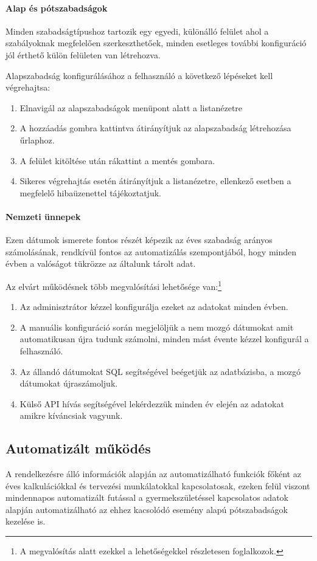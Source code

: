 \paragraph{Alap és pótszabadságok}
Minden szabadságtípushoz tartozik egy egyedi, különálló felület ahol a szabályoknak megfelelően szerkeszthetőek, minden esetleges további konfiguráció jól érthető külön felületen van létrehozva.

	Alapszabadság konfigurálásához a felhasználó a következő lépéseket kell végrehajtsa:
	\begin{enumerate}
		\item Elnavigál az alapszabadságok menüpont alatt a listanézetre
		\item A hozzáadás gombra kattintva átirányítjuk az alapszabadság létrehozása űrlaphoz.
		\item A felület kitöltése után rákattint a mentés gombara.
		\item Sikeres végrehajtás esetén átirányítjuk a listanézetre, ellenkező esetben a megfelelő hibaüzenettel tájékoztatjuk.
	\end{enumerate}

\paragraph{Nemzeti ünnepek}
Ezen dátumok ismerete fontos részét képezik az éves szabadság arányos számolásának, rendkívül fontos az automatizálás szempontjából, hogy minden évben a valóságot tükrözze az általunk tárolt adat.

Az elvárt működésnek több megvalósítási lehetősége van:\footnote{A megvalósítás alatt ezekkel a lehetőségekkel részletesen foglalkozok.}
\begin{enumerate}
	\item Az adminisztrátor kézzel konfigurálja ezeket az adatokat minden évben.
	\item A manuális konfiguráció során megjelöljük a nem mozgó dátumokat amit automatikusan újra tudunk számolni, minden mást évente kézzel konfigurál a felhasználó.
	\item Az állandó dátumokat SQL segítségével beégetjük az adatbázisba, a mozgó dátumokat újraszámoljuk.
	\item Külső API hívás segítségével lekérdezzük minden év elején az adatokat amikre kíváncsiak vagyunk. 
\end{enumerate}

\subsection{Automatizált működés}
A rendelkezésre álló információk alapján az automatizálható funkciók főként az éves kalkulációkkal és tervezési munkálatokkal kapcsolatosak, ezeken felül viszont mindennapos automatizált futással a gyermekszületéssel kapcsolatos adatok alapján automatizálható az ehhez kacsolódó esemény alapú pótszabadságok kezelése is.

